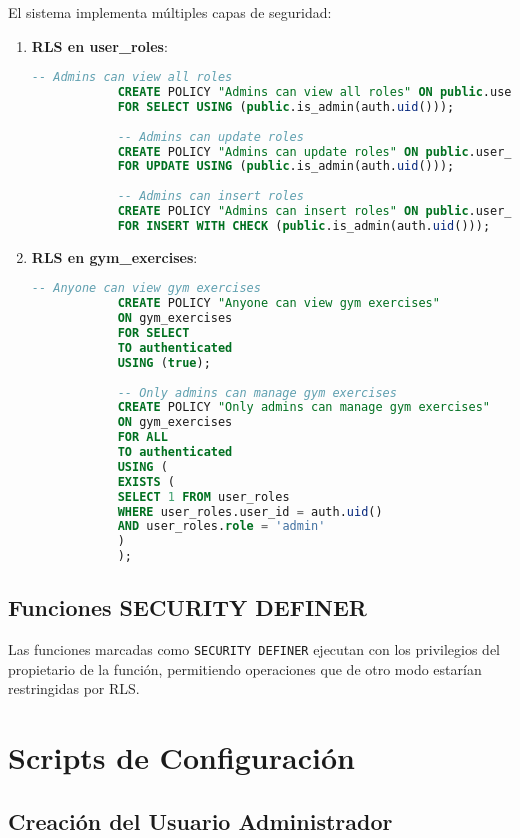 \documentclass[12pt,a4paper]{article}
\begin{document}
	El sistema implementa múltiples capas de seguridad:
	
	\begin{enumerate}
		\item \textbf{RLS en user\_roles}:
		\begin{lstlisting}[language=SQL, caption=Políticas RLS para user\_roles]
			-- Admins can view all roles
			CREATE POLICY "Admins can view all roles" ON public.user_roles
			FOR SELECT USING (public.is_admin(auth.uid()));
			
			-- Admins can update roles
			CREATE POLICY "Admins can update roles" ON public.user_roles
			FOR UPDATE USING (public.is_admin(auth.uid()));
			
			-- Admins can insert roles
			CREATE POLICY "Admins can insert roles" ON public.user_roles
			FOR INSERT WITH CHECK (public.is_admin(auth.uid()));
		\end{lstlisting}
		
		\item \textbf{RLS en gym\_exercises}:
		\begin{lstlisting}[language=SQL, caption=Políticas RLS para gym\_exercises]
			-- Anyone can view gym exercises
			CREATE POLICY "Anyone can view gym exercises"
			ON gym_exercises
			FOR SELECT
			TO authenticated
			USING (true);
			
			-- Only admins can manage gym exercises
			CREATE POLICY "Only admins can manage gym exercises"
			ON gym_exercises
			FOR ALL
			TO authenticated
			USING (
			EXISTS (
			SELECT 1 FROM user_roles
			WHERE user_roles.user_id = auth.uid()
			AND user_roles.role = 'admin'
			)
			);
		\end{lstlisting}
	\end{enumerate}
	
	\subsection{Funciones SECURITY DEFINER}
	
	Las funciones marcadas como \texttt{SECURITY DEFINER} ejecutan con los privilegios del propietario de la función, permitiendo operaciones que de otro modo estarían restringidas por RLS.
	
	\section{Scripts de Configuración}
	
	\subsection{Creación del Usuario Administrador}
	
\end{document}
